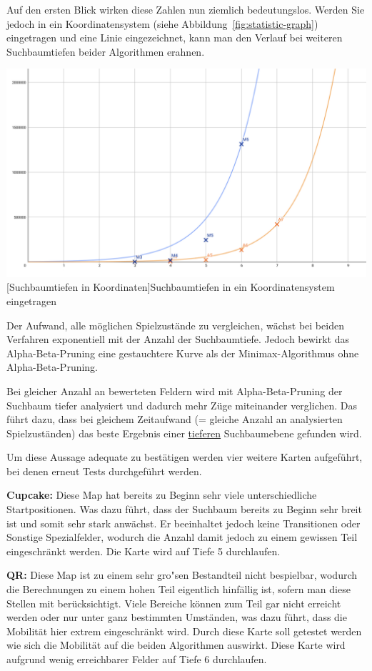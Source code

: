 Auf den ersten Blick wirken diese Zahlen nun ziemlich bedeutungslos.
Werden Sie jedoch in ein Koordinatensystem (siehe Abbildung~\ref{fig:statistic-graph}) eingetragen und eine Linie eingezeichnet, kann man den Verlauf bei weiteren Suchbaumtiefen beider Algorithmen erahnen.

\vspace{1em}
\begin{minipage}{\linewidth}
    \centering
    \includegraphics[width=0.7\linewidth]{pics/statistic-graph}
    [Suchbaumtiefen in Koordinaten]{Suchbaumtiefen in ein Koordinatensystem eingetragen}
    \label{fig:statistic-graph}
\end{minipage}

Der Aufwand, alle m\"oglichen Spielzust\"ande zu vergleichen, w\"achst bei beiden Verfahren exponentiell mit der Anzahl der Suchbaumtiefe.
Jedoch bewirkt das Alpha-Beta-Pruning eine gestauchtere Kurve als der Minimax-Algorithmus ohne Alpha-Beta-Pruning.

Bei gleicher Anzahl an bewerteten Feldern wird mit Alpha-Beta-Pruning der Suchbaum tiefer analysiert und dadurch mehr Z\"uge miteinander verglichen.
Das f\"uhrt dazu, dass bei gleichem Zeitaufwand (= gleiche Anzahl an analysierten Spielzust\"anden) das beste Ergebnis einer \underline{tieferen} Suchbaumebene gefunden wird.

Um diese Aussage adequate zu best\"atigen werden vier weitere Karten aufgef\"uhrt, bei denen erneut Tests durchgef\"uhrt werden.

\textbf{Cupcake:}
Diese Map hat bereits zu Beginn sehr viele unterschiedliche Startpositionen.
Was dazu f\"uhrt, dass der Suchbaum bereits zu Beginn sehr breit ist und somit sehr stark anw\"achst.
Er beeinhaltet jedoch keine Transitionen oder Sonstige Spezialfelder, wodurch die Anzahl damit jedoch zu einem gewissen Teil eingeschr\"ankt werden.
Die Karte wird auf Tiefe 5 durchlaufen.

\textbf{QR:}
Diese Map ist zu einem sehr gro"sen Bestandteil nicht bespielbar, wodurch die Berechnungen zu einem hohen Teil eigentlich hinf\"allig ist, sofern man diese Stellen mit ber\"ucksichtigt.
Viele Bereiche k\"onnen zum Teil gar nicht erreicht werden oder nur unter ganz bestimmten Umst\"anden, was dazu f\"uhrt, dass die Mobilit\"at hier extrem eingeschr\"ankt wird.
Durch diese Karte soll getestet werden wie sich die Mobilit\"at auf die beiden Algorithmen auswirkt.
Diese Karte wird aufgrund wenig erreichbarer Felder auf Tiefe 6 durchlaufen.

